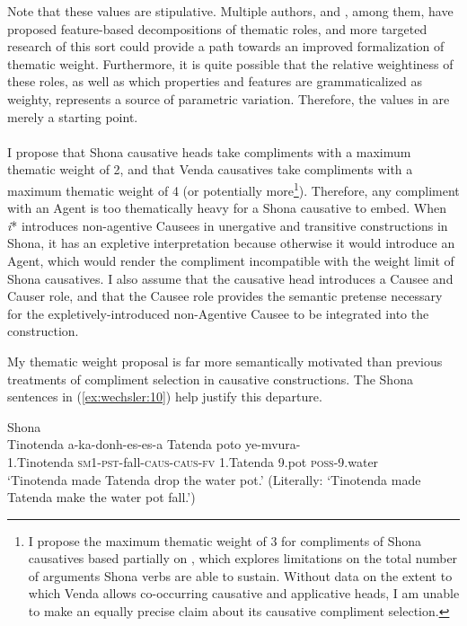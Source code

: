 \documentclass[output=paper,modfonts,nonflat,colorlinks,citecolor=brown]{langsci/langscibook}
\begin{document}
Note that these values are stipulative. Multiple authors, \citet{Wunderlich1997} and \citet{Mylne1999}, among them, have proposed feature-based decompositions of thematic roles, and more targeted research of this sort could provide a path towards an improved formalization of thematic weight. Furthermore, it is quite possible that the relative weightiness of these roles, as well as which properties and features are grammaticalized as weighty, represents a source of parametric variation. Therefore, the values in  are merely a starting point.\\
\\
I propose that Shona causative heads take compliments with a maximum thematic weight of 2, and that Venda causatives take compliments with a maximum thematic weight of 4 (or potentially more\footnote{I propose the maximum thematic weight of 3 for compliments of Shona causatives based partially on \citet{Wechsler2014}, which explores limitations on the total number of arguments Shona verbs are able to sustain. Without data on the extent to which Venda allows co-occurring causative and applicative heads, I am unable to make an equally precise claim about its causative compliment selection.}). Therefore, any compliment with an Agent is too thematically heavy for a Shona causative to embed. When \textit{i}* introduces non-agentive Causees in unergative and transitive constructions in Shona, it has an expletive interpretation because otherwise it would introduce an Agent, which would render the compliment incompatible with the weight limit of Shona causatives. I also assume that the causative head introduces a Causee and Causer role, and that the Causee role provides the semantic pretense necessary for the expletively-introduced non-Agentive Causee to be integrated into the construction. 



My thematic weight proposal is far more semantically motivated than previous treatments of compliment selection in causative constructions. The Shona sentences in (\ref{ex:wechsler:10}) help justify this departure.


\ea\label{ex:wechsler:10}
Shona\\ 
\ea\label{ex:wechsler:10a}
\gll Tinotenda {a-ka-donh-es-es-a}  {{Tatenda}}  {{poto}} {ye-mvura}-\\
 1.Tinotenda  \textsc{sm}1-\textsc{pst}{}-fall-\textsc{caus}{}-\textsc{caus}{}-\textsc{fv}  {1.Tatenda}  {9.pot}  \textsc{poss}{}-9.water\\
\glt `Tinotenda made Tatenda drop the water pot.’
(Literally: ‘Tinotenda made Tatenda make the water pot fall.’)\\
\end{document}
